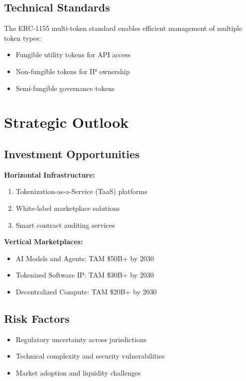 \documentclass[11pt,a4paper]{report}
\begin{document}
\section{Technical Standards}

The ERC-1155 multi-token standard enables efficient management of multiple token types:
\begin{itemize}
    \item Fungible utility tokens for API access
    \item Non-fungible tokens for IP ownership
    \item Semi-fungible governance tokens
\end{itemize}

\chapter{Strategic Outlook}

\section{Investment Opportunities}

\textbf{Horizontal Infrastructure:}
\begin{enumerate}
    \item Tokenization-as-a-Service (TaaS) platforms
    \item White-label marketplace solutions
    \item Smart contract auditing services
\end{enumerate}

\textbf{Vertical Marketplaces:}
\begin{itemize}
    \item AI Models and Agents: TAM \$50B+ by 2030
    \item Tokenized Software IP: TAM \$30B+ by 2030
    \item Decentralized Compute: TAM \$20B+ by 2030
\end{itemize}

\section{Risk Factors}
\begin{itemize}
    \item Regulatory uncertainty across jurisdictions
    \item Technical complexity and security vulnerabilities
    \item Market adoption and liquidity challenges
\end{itemize}
\end{document}
